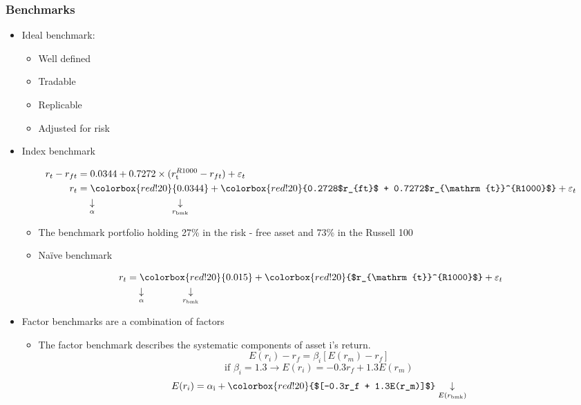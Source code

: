 \subsubsection{Benchmarks}
\begin{itemize}
\item Ideal benchmark:
    \begin{itemize}
    \item Well defined
    \item Tradable
    \item Replicable
    \item Adjusted for risk
    \end{itemize}
\item Index benchmark

\begin{align}
    r_t - r_{ft} &= 0.0344 + 0.7272 \times (r_{\mathrm{t}}^{R1000} - r_{ft}) + \varepsilon_t \\
    r_t &= \colorbox{red!20}{0.0344} + \colorbox{red!20}{0.2728$r_{ft}$ + 0.7272$r_{\mathrm{t}}^{R1000}$} + \varepsilon_t \\
    &\quad \underset{\alpha}{\downarrow} \quad \quad \quad \quad \quad \quad \quad \quad \underset{r_{\mathrm{bmk}}}{\downarrow} \notag
    \end{align}
    \begin{itemize}
        \item \textcolor{blue}{\checkmark} The benchmark portfolio holding 27\% in the risk - free asset and 73\% in the Russell 100
        \item \textcolor{blue}{\checkmark} Naïve benchmark
    \end{itemize}
    \begin{align}
    r_t &= \colorbox{red!20}{0.015} + \colorbox{red!20}{$r_{\mathrm{t}}^{R1000}$} + \varepsilon_t \\
    &\quad \underset{\alpha}{\downarrow} \quad \quad \quad \quad \underset{r_{\mathrm{bmk}}}{\downarrow} \notag
    \end{align}

\item Factor benchmarks are a combination of factors
    \begin{itemize}
    \item The factor benchmark describes the systematic components of asset i's return.
    \[
E(r_i) - r_f = \beta_i [E(r_m) - r_f]
\]
\[
\text{if } \beta_i = 1.3 \rightarrow E(r_i) = -0.3r_f + 1.3E(r_m)
\]
\[
E(r_i) = \alpha_{\mathrm{i}} + \colorbox{red!20}{$[-0.3r_f + 1.3E(r_m)]$} \newline \underset{E(r_{\mathrm{bmk}})}{\downarrow}
\]
    \end{itemize}


\end{itemize}
